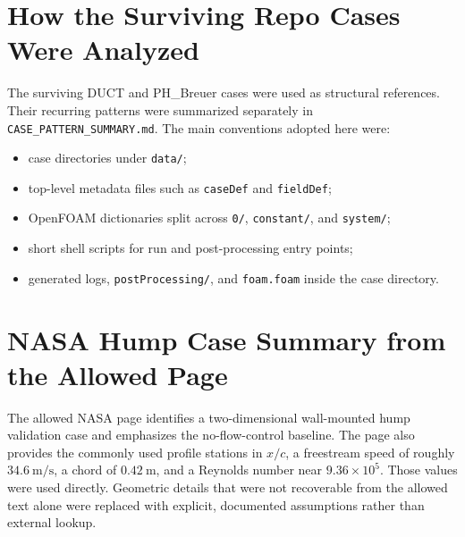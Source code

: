 \documentclass[11pt]{article}
\begin{document}
\section{How the Surviving Repo Cases Were Analyzed}
The surviving DUCT and PH\_Breuer cases were used as structural references. Their recurring patterns were summarized separately in \texttt{CASE\_PATTERN\_SUMMARY.md}. The main conventions adopted here were:
\begin{itemize}
\item case directories under \texttt{data/};
\item top-level metadata files such as \texttt{caseDef} and \texttt{fieldDef};
\item OpenFOAM dictionaries split across \texttt{0/}, \texttt{constant/}, and \texttt{system/};
\item short shell scripts for run and post-processing entry points;
\item generated logs, \texttt{postProcessing/}, and \texttt{foam.foam} inside the case directory.
\end{itemize}

\section{NASA Hump Case Summary from the Allowed Page}
The allowed NASA page identifies a two-dimensional wall-mounted hump validation case and emphasizes the no-flow-control baseline. The page also provides the commonly used profile stations in \(x/c\), a freestream speed of roughly \(34.6~\mathrm{m/s}\), a chord of \(0.42~\mathrm{m}\), and a Reynolds number near \(9.36\times 10^5\). Those values were used directly. Geometric details that were not recoverable from the allowed text alone were replaced with explicit, documented assumptions rather than external lookup.
\end{document}
